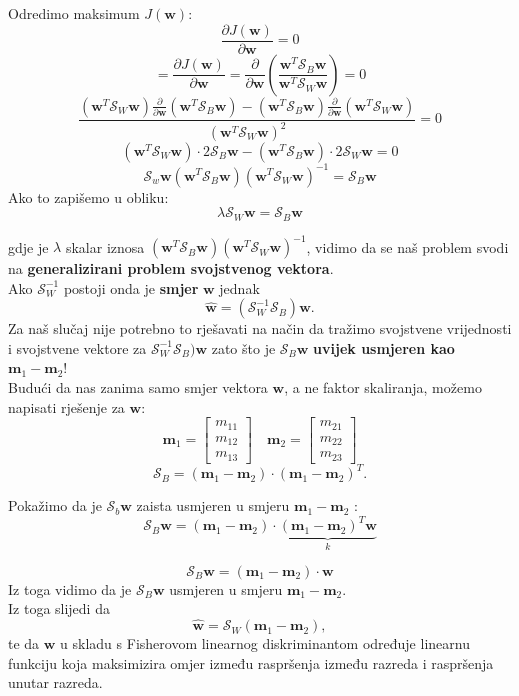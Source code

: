 \documentclass{book}
\begin{document}
Odredimo maksimum $J(\mathbf{w})$:
$$ \frac{\partial J(\mathbf{w})}{\partial \mathbf{w}} = 0 $$
$$ = \frac{\partial J(\mathbf{w})}{\partial \mathbf{w}} =
\frac{\partial}{\partial \mathbf{w}} \left (
\frac{\mathbf{w}^T\mathcal{S}_B\mathbf{w}}{\mathbf{w}^T\mathcal{S}_W\mathbf{w}}
\right ) = 0 $$
$$ \frac{(\mathbf{w}^T\mathcal{S}_W\mathbf{w})\frac{\partial}{\partial
\mathbf{w}}(\mathbf{w}^T\mathcal{S}_B\mathbf{w}) -
(\mathbf{w}^T\mathcal{S}_B\mathbf{w})\frac{\partial}{\partial
\mathbf{w}}(\mathbf{w}^T\mathcal{S}_W\mathbf{w})
}{(\mathbf{w}^T\mathcal{S}_W\mathbf{w})^2} = 0 $$
$$ (\mathbf{w}^T\mathcal{S}_W\mathbf{w})\cdot 2\mathcal{S}_B\mathbf{w} -
(\mathbf{w}^T\mathcal{S}_B\mathbf{w})\cdot 2\mathcal{S}_W\mathbf{w} = 0  $$
$$\mathcal{S}_w\mathbf{w}(\mathbf{w}^T\mathcal{S}_B\mathbf{w})
(\mathbf{w}^T\mathcal{S}_W\mathbf{w})^{-1} = \mathcal{S}_B\mathbf{w} $$
Ako to zapišemo u obliku:
$$ \lambda \mathcal{S}_W\mathbf{w} = \mathcal{S}_B\mathbf{w} $$

gdje je $\lambda$ skalar iznosa $(\mathbf{w}^T\mathcal{S}_B\mathbf{w})
(\mathbf{w}^T\mathcal{S}_W\mathbf{w})^{-1}$, vidimo da se naš problem svodi na
\textbf{generalizirani problem svojstvenog vektora}. \\

Ako $\mathcal{S}_W^{-1}$ postoji onda je \textbf{smjer} $\mathbf{w}$ jednak 
$$ \hat{\mathbf{w}} = (\mathcal{S}_W^{-1}\mathcal{S}_B)\mathbf{w}.$$
Za naš slučaj nije potrebno to rješavati na način da tražimo svojstvene
vrijednosti i svojstvene vektore za $\mathcal{S}_W^{-1}\mathcal{S}_B)\mathbf{w}$
zato što je $\mathcal{S}_B\mathbf{w}$ \textbf{uvijek usmjeren kao}
$\mathbf{m}_1-\mathbf{m}_2 $! \\
Budući da nas zanima samo smjer vektora $\mathbf{w}$, a ne faktor skaliranja,
možemo napisati rješenje za $\mathbf{w}$:
$$ \mathbf{m}_1 = \begin{bmatrix}
m_{11} \\
m_{12} \\
m_{13}
\end{bmatrix} \quad \mathbf{m}_2 = \begin{bmatrix}
m_{21} \\
m_{22} \\
m_{23}
\end{bmatrix} $$
$$ \mathcal{S}_B = ( \mathbf{m}_1 - \mathbf{m}_2 ) \cdot (\mathbf{m}_1 -
\mathbf{m}_2)^T. $$

Pokažimo da je $\mathcal{S}_b\mathbf{w}$ zaista usmjeren u smjeru $\mathbf{m}_1
- \mathbf{m}_2$ :
$$ \mathcal{S}_B\mathbf{w} = ( \mathbf{m}_1 - \mathbf{m}_2 ) 
\cdot \underbrace{(\mathbf{m}_1
- \mathbf{m}_2)^T \mathbf{w}}_{k}  $$

$$ \mathcal{S}_B\mathbf{w} = ( \mathbf{m}_1 - \mathbf{m}_2 ) \cdot \mathbf{w} $$
Iz toga vidimo da je $\mathcal{S}_B\mathbf{w}$ usmjeren u smjeru $\mathbf{m}_1 -
\mathbf{m}_2$. \\

Iz toga slijedi da 
$$ \hat{\mathbf{w}} = \mathcal{S}_W(\mathbf{m}_1 - \mathbf{m}_2) ,$$
te da  $\mathbf{w}$ u skladu s Fisherovom linearnog diskriminantom određuje
linearnu funkciju koja maksimizira omjer između raspršenja između razreda  i
raspršenja unutar razreda.
\end{document}
